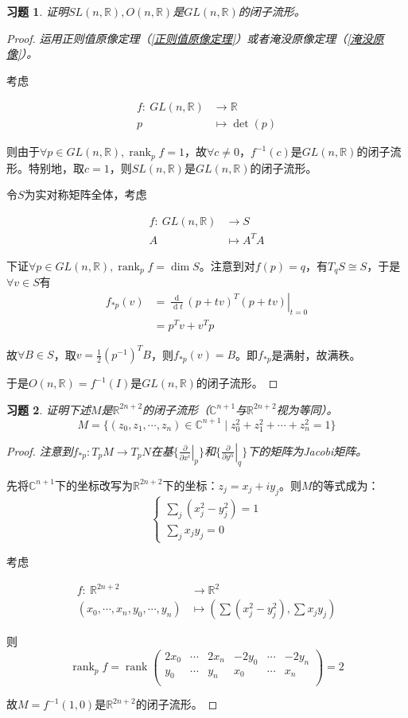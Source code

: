 \documentclass[winfonts,UTF8,c5size,a4paper,fancyhdr,hyperref,titlepage,nocap]{ctexart}
\newtheorem{xiti}{习题}
\theoremstyle{definition}
\theoremstyle{remark}
\numberwithin{equation}{subsection}
\newcommand{\Real}{\mathbb{R}}
\newcommand{\Complex}{\mathbb{C}}
\newcommand{\dt}{\frac{\operatorname{d}}{\operatorname{d}t}}
\newcommand{\pfrac}[2]{\frac{\partial{#1}}{\partial{#2}}}
\newcommand{\px}[1]{\left.\pfrac{}{x^{#1}}\right|_p}
\newcommand{\py}[1]{\left.\pfrac{}{y^{#1}}\right|_q}
\newcommand{\rank}{\operatorname{rank}}
\newcommand{\local}[2]{\left.{#1}\right|_{#2}}%
\newcommand{\localt}[1]{\local{#1}{t=0}}%
\newcommand{\mapdes}[5]
  {
    \begin{align*}
      #1\colon\  #2 & \longrightarrow  #3 \\
            #4 & \mapsto  #5
    \end{align*}
  }
\begin{document}
\begin{xiti}
  证明$SL(n,\Real), O(n,\Real)$是$GL(n,\Real)$的闭子流形。
\end{xiti}
\begin{proof}
  \emph{运用正则值原像定理（\ref{正则值原像定理}）或者淹没原像定理（\ref{淹没原像}）。}

  考虑
\mapdes{f}{GL(n,\Real)}{\Real}{p}{\det(p)}

则由于$\forall p\in GL(n,\Real),\rank_pf=1$，故$\forall c\neq0$，$f^{-1}(c)$是$GL(n,\Real)$的闭子流形。特别地，取$c=1$，则$SL(n,\Real)$是$GL(n,\Real)$的闭子流形。

令$S$为实对称矩阵全体，考虑
\mapdes{f}{GL(n,\Real)}{S}{A}{A^{T}A}

下证$\forall p\in GL(n,\Real),\rank_pf=\dim S$。注意到对$f(p)=q$，有$T_qS\cong S$，于是$\forall v\in S$有
\begin{align*}
f_{\ast p}(v)&=\localt{\dt (p+tv)^{T}(p+tv)}\\
             &=p^Tv+v^Tp
\end{align*}

故$\forall B\in S$，取$v=\frac{1}{2}(p^{-1})^TB$，则$f_{\ast p}(v)=B$。即$f_{\ast p}$是满射，故满秩。

于是$O(n,\Real)=f^{-1}(I)$是$GL(n,\Real)$的闭子流形。
\end{proof}

\begin{xiti}
  证明下述$M$是$\Real^{2n+2}$的闭子流形（$\Complex^{n+1}$与$\Real^{2n+2}$视为等同）。
  \begin{equation*}
  M=\{(z_0,z_1,\cdots,z_n)\in\Complex^{n+1}\mid z_0^2+z_1^2+\cdots+z_n^2=1\}
  \end{equation*}
\end{xiti}
\begin{proof}
  \emph{注意到$f_{\ast p}\colon T_pM\to T_pN$在基$\{\px{i}\}$和$\{\py{\alpha}\}$下的矩阵为Jacobi矩阵。}

先将$\Complex^{n+1}$下的坐标改写为$\Real^{2n+2}$下的坐标：$z_j=x_j+iy_j$。则$M$的等式成为：
\begin{equation*}
\begin{cases}
\sum_j(x_j^2-y_j^2)=1\\
\sum_jx_jy_j=0
\end{cases}
\end{equation*}

考虑
\mapdes{f}{\Real^{2n+2}}{\Real^2}{(x_0,\cdots,x_n,y_0,\cdots,y_n)}{(\sum(x_j^2-y_j^2),\sum x_jy_j)}

则
\begin{equation*}
\rank_pf=\rank
    \begin{pmatrix}
      2x_0 & \cdots & 2x_n & -2y_0 & \cdots & -2y_n \\
      y_0 & \cdots & y_n & x_0 & \cdots & x_n \\
    \end{pmatrix}
=2
\end{equation*}

故$M=f^{-1}(1,0)$是$\Real^{2n+2}$的闭子流形。
\end{proof}
\end{document}
